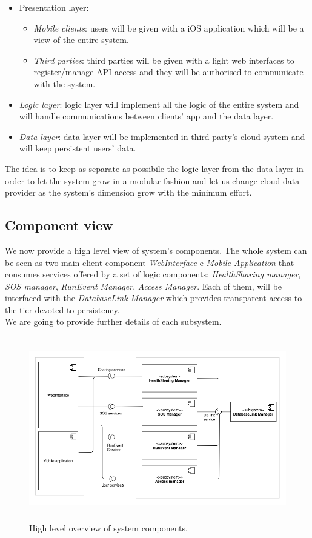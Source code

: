 \documentclass[DD.tex]{subfiles}
\begin{document}
\begin{itemize}
	\item Presentation layer:\begin{itemize}
			\item \textit{Mobile clients}: users will be given with a iOS application which will be a view of the entire system.
			\item \textit{Third parties}: third parties will be given with a light web interfaces to register/manage API access and they will be authorised to communicate with the system.
			\end{itemize}
	\item \textit{Logic layer}: logic layer will implement all the logic of the entire system and will handle communications between clients' app and the data layer.
	\item \textit{Data layer}: data layer will be implemented in third party's cloud system and will keep persistent users' data.
\end{itemize}

The idea is to keep as separate as possibile the logic layer from the data layer in order to let the system grow in a modular fashion and let us change cloud data provider as the system's dimension grow with the minimum effort.
\newpage

\subsection{Component view}
We now provide a high level view of system's components. The whole system can be seen as two main client component \textit{WebInterface} e \textit{Mobile Application} that consumes services offered by a set of logic components: \textit{HealthSharing manager}, \textit{SOS manager}, \textit{RunEvent Manager}, \textit{Access Manager}. Each of them, will be interfaced with the \textit{DatabaseLink Manager} which provides transparent access to the tier devoted to persistency.
\\ We are going to provide further details of each subsystem.

\begin{figure}[h!]
	\centering
	\includegraphics[height=8.00cm,keepaspectratio]{Figures/ComponentOverview}
	\caption{High level overview of system components.}
\end{figure}
\end{document}
